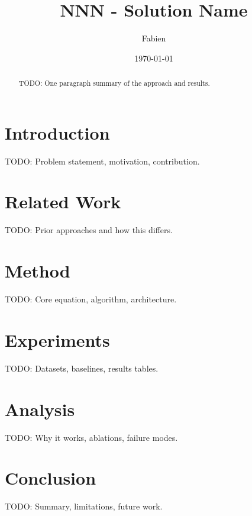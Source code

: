 \documentclass[11pt]{article}
\title{NNN - Solution Name}
\author{Fabien}
\date{\today}
\begin{document}
\maketitle

\begin{abstract}
TODO: One paragraph summary of the approach and results.
\end{abstract}

\section{Introduction}
TODO: Problem statement, motivation, contribution.

\section{Related Work}
TODO: Prior approaches and how this differs.

\section{Method}
TODO: Core equation, algorithm, architecture.

\section{Experiments}
TODO: Datasets, baselines, results tables.

\section{Analysis}
TODO: Why it works, ablations, failure modes.

\section{Conclusion}
TODO: Summary, limitations, future work.



\end{document}
